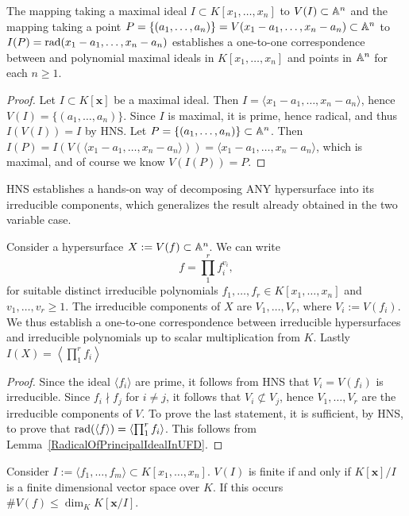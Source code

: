 \begin{corollary}
    The mapping taking a maximal ideal $I\subset K[x_1,\dots,x_n]$ to $V(I)\subset \mathbb{A}^n$ and the mapping taking a point $P=\{(a_1,\dots,a_n)\}=V(x_1-a_1,\dots,x_n-a_n)\subset \mathbb{A}^n$ to $I(P)=\mathrm{rad}(x_1-a_1,\dots,x_n-a_n)$ establishes a one-to-one correspondence between and polynomial maximal ideals in $K[x_1,\dots,x_n]$ and points in $\mathbb{A}^n$ for each $n\geq 1$.
\end{corollary}
\begin{proof}
    Let $I\subset K[\mathbf{x}]$ be a maximal ideal. Then $I=\langle x_1-a_1,\dots,x_n-a_n\rangle$, hence $V(I)=\{(a_1,\dots,a_n)\}$. Since $I$ is maximal, it is prime, hence radical, and thus $I(V(I))=I$ by HNS. Let $P = \{(a_1,\dots,a_n)\}\subset \mathbb{A}^n$. Then $I(P)=I(V(\langle x_1-a_1,\dots,x_n-a_n\rangle))= \langle x_1-a_1,\dots,x_n-a_n\rangle$, which is maximal, and of course we know $V(I(P))=P$.   
\end{proof}
HNS establishes a hands-on way of decomposing ANY hypersurface into its irreducible components, which generalizes the result already obtained in the two variable case. 
\begin{corollary}
    Consider a hypersurface $X:=V(f)\subset \mathbb{A}^n$. We can write 
    $$f = \prod_1^r f_i^{v_i},$$
    for suitable distinct irreducible polynomials $f_1,\dots,f_r\in K[x_1,\dots,x_n]$ and $v_1,\dots,v_r\geq 1$. The irreducible components of $X$ are $V_1,\dots,V_r$, where $V_i:= V(f_i)$. We thus establish a one-to-one correspondence between irreducible hypersurfaces and irreducible polynomials up to scalar multiplication from $K$. Lastly $I(X)=\left\langle\prod_1^r f_i \right\rangle$ 
\end{corollary}
\begin{proof}
    Since the ideal $\langle f_i\rangle$ are prime, it follows from HNS that $V_i=V(f_i)$ is irreducible. Since $f_i\nmid f_j$ for $i\neq j$, it follows that $V_i\not\subset V_j$, hence $V_1,\dots,V_r$ are the irreducible components of $V$. To prove the last statement, it is sufficient, by HNS, to prove that $\mathrm{rad}(\langle f\rangle)=\left\langle\prod_1^r f_i \right\rangle$. This follows from Lemma~\ref{RadicalOfPrincipalIdealInUFD}.
\end{proof}
\begin{corollary}\label{DimensionOfCoordinateRing}
    Consider $I:=\langle f_1,\dots,f_m\rangle\subset K[x_1,\dots,x_n]$. $V(I)$ is finite if and only if $K[\mathbf{x}]/I$ is a finite dimensional vector space over $K$. If this occurs $\#V(f)\leq \dim_K K[\mathbf{x}/I]$.
\end{corollary}
